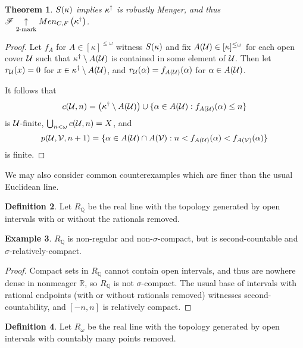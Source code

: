 \documentclass{amsart}
\newtheorem{theorem}{Theorem}[section]
\theoremstyle{definition}
\newtheorem{definition}[theorem]{Definition}
\newtheorem{example}[theorem]{Example}
\begin{document}
\begin{theorem}
  \(S(\kappa)\) implies \(\kappa^\dagger\) is
  robustly Menger, and thus
  \(\mathscr{F}\underset{2\text{-mark}}{\uparrow}Men_{C,F}\left({\kappa^\dagger}\right)\).
\end{theorem}

\begin{proof}
  Let \(f_A\) for \(A\in[\kappa]^{\leq\omega}\) witness \(S(\kappa)\) and fix
  \(A(\mathcal{U})\in[\kappa]^{\leq\omega}\) for each open cover \(\mathcal{U}\) such that
  \(\kappa^\dagger\setminus A(\mathcal{U})\) is contained in some element of
  \(\mathcal{U}\).
  Then let \(r_{\mathcal{U}}(x)=0\) for \(x\in\kappa^\dagger\setminus A(\mathcal{U})\),
  and \(r_{\mathcal{U}}(\alpha)=f_{A(\mathcal{U})}(\alpha)\) for \(\alpha\in A(\mathcal{U})\).

  It follows that
    \[
      c(\mathcal{U},n)
        =
      \left(\kappa^\dagger\setminus A(\mathcal{U})\right)
        \cup
      \{\alpha\in A(\mathcal{U}) : f_{A(\mathcal{U})}(\alpha)\leq n \}
    \]
  is \(\mathcal{U}\)-finite, \(\bigcup_{n<\omega}c(\mathcal{U},n)=X\), and
    \[
      p(\mathcal{U},\mathcal{V},n+1)
        =
      \{
        \alpha\in A(\mathcal{U})\cap A(\mathcal{V})
          :
        n < f_{A(\mathcal{U})}(\alpha) < f_{A(\mathcal{V})}(\alpha)
      \}
    \]
  is finite.
\end{proof}

We may also consider common counterexamples which are finer
than the usual Euclidean line.

\begin{definition}
  Let \(R_{\mathbb Q}\) be the real line with the topology generated by open
  intervals with or without the rationals removed.
\end{definition}

\begin{example}
  \(R_{\mathbb Q}\) is non-regular and non-\(\sigma\)-compact, but is
  second-countable and \(\sigma\)-relatively-compact.
\end{example}

\begin{proof}
  Compact sets in \(R_{\mathbb Q}\) cannot contain open intervals,
  and thus are nowhere dense in nonmeager \(\mathbb R\),
  so \(R_{\mathbb Q}\) is not \(\sigma\)-compact. The usual base of
  intervals with rational endpoints (with or without rationals removed)
  witnesses second-countability, and \([-n,n]\) is relatively compact.
\end{proof}

\begin{definition}
  Let \(R_\omega\) be the real line with the topology generated by open
  intervals with countably many points removed.
\end{definition}
\end{document}
